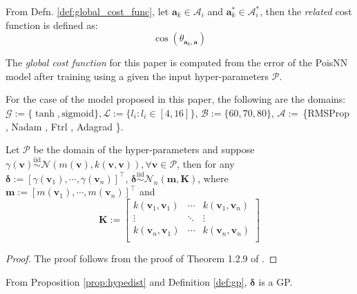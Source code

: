 \begin{defnx}
    From Defn. \ref{def:global_cost_func}, let $\mathbf{a}_k\in\mathscr{A}_i$ and $\mathbf{a}_k^{*}\in\mathscr{A}_i^{*}$, then the \textit{related} cost function is defined as:
    \begin{equation}
        \cos(\theta_{\mathbf{a}_k,\mathbf{a}})
    \end{equation}
\end{defnx}
\begin{remark}
    The \textit{global cost function} for this paper is computed from the error of the PoisNN model after training using a given the input hyper-parameters $\mathscr{P}$.
\end{remark}
\begin{remark}
    For the case of the model proposed in this paper, the following are the domains: $\mathscr{G}:=\{\tanh,\mathrm{sigmoid}\},\mathscr{L}:=\{l_i: l_i\in [4, 16]\}$, $\mathscr{B}:=\{60, 70, 80\}$, $\mathscr{A}:=$\,\{RMSProp \cite{hinton2012}, Nadam \cite{Dozat2016IncorporatingNM}, Ftrl \cite{ftrl}, Adagrad \cite{JMLR:adagrad}\}.
\end{remark}
\begin{prop}\label{prop:hypedist}
    Let $\mathscr{P}$ be the domain of the hyper-parameters and suppose $\gamma(\mathbf{v})\overset{\mathrm{iid}}{\sim}\mathcal{N}(m(\mathbf{v}),k(\mathbf{v},\mathbf{v})), \forall \mathbf{v}\in\mathscr{P}$, then for any $\boldsymbol{\delta}:=[\gamma(\mathbf{v}_1),\cdots,\gamma(\mathbf{v}_n)]^{\top}$, $\boldsymbol{\delta}\overset{\mathrm{iid}}{\sim}\mathcal{N}_n(\mathbf{m},\mathbf{K})$, where $\mathbf{m}:=[m(\mathbf{v}_1),\cdots,m(\mathbf{v}_n)]^{\top}$ and
    \begin{equation}
        \mathbf{K}:=\left[\begin{matrix}
        k(\mathbf{v}_1,\mathbf{v}_1)&\cdots&k(\mathbf{v}_1,\mathbf{v}_n)\\
        \vdots&\ddots&\vdots\\
        k(\mathbf{v}_n,\mathbf{v}_1)&\cdots&k(\mathbf{v}_n,\mathbf{v}_n)\\
        \end{matrix}\right]
    \end{equation}
\end{prop}
\begin{proof}
    The proof follows from the proof of Theorem 1.2.9 of .
\end{proof}
\begin{remark}
    From Proposition \ref{prop:hypedist} and Definition \ref{def:gp}, $\boldsymbol{\delta}$ is a GP.
\end{remark}
